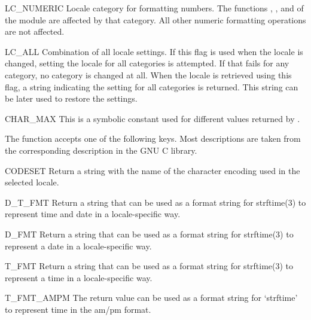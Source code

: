 \begin{datadesc}{LC_NUMERIC}
  Locale category for formatting numbers.  The functions
  , ,  and
   of the  module are affected by that
  category.  All other numeric formatting operations are not
  affected.
\end{datadesc}

\begin{datadesc}{LC_ALL}
  Combination of all locale settings.  If this flag is used when the
  locale is changed, setting the locale for all categories is
  attempted. If that fails for any category, no category is changed at
  all.  When the locale is retrieved using this flag, a string
  indicating the setting for all categories is returned. This string
  can be later used to restore the settings.
\end{datadesc}

\begin{datadesc}{CHAR_MAX}
  This is a symbolic constant used for different values returned by
  .
\end{datadesc}

The  function accepts one of the following keys.
Most descriptions are taken from the corresponding description in the
GNU C library.

\begin{datadesc}{CODESET}
Return a string with the name of the character encoding used in the
selected locale.
\end{datadesc}

\begin{datadesc}{D_T_FMT}
Return a string that can be used as a format string for strftime(3) to
represent time and date in a locale-specific way.
\end{datadesc}

\begin{datadesc}{D_FMT}
Return a string that can be used as a format string for strftime(3) to
represent a date in a locale-specific way.
\end{datadesc}

\begin{datadesc}{T_FMT}
Return a string that can be used as a format string for strftime(3) to
represent a time in a locale-specific way.
\end{datadesc}

\begin{datadesc}{T_FMT_AMPM}
The return value can be used as a format string for `strftime' to
represent time in the am/pm format.
\end{datadesc}

